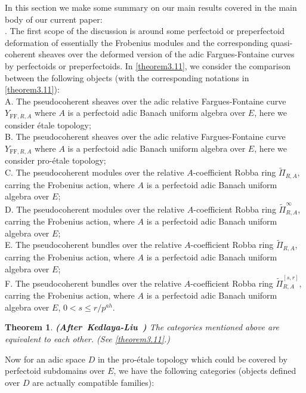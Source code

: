 \documentclass[12pt]{amsart}
\newtheorem{theorem}{Theorem}[section]
\theoremstyle{definition}
\numberwithin{equation}{section}
\begin{document}
\indent In this section we make some summary on our main results covered in the main body of our current paper:\\

. The first scope of the discussion is around some perfectoid or preperfectoid deformation of essentially the Frobenius modules and the corresponding quasi-coherent sheaves over the deformed version of the adic Fargues-Fontaine curves by perfectoids or preperfectoids. In \cref{theorem3.11}, we consider the comparison between the following objects (with the corresponding notations in \cref{theorem3.11}):\\

\noindent A. The pseudocoherent sheaves over the adic relative Fargues-Fontaine curve $Y_{\mathrm{FF},R,A}$ where $A$ is a perfectoid adic Banach uniform algebra over $E$, here we consider \'etale topology;\\
\noindent B. The pseudocoherent sheaves over the adic relative Fargues-Fontaine curve $Y_{\mathrm{FF},R,A}$ where $A$ is a perfectoid adic Banach uniform algebra over $E$, here we consider pro-\'etale topology;\\
\noindent C. The pseudocoherent modules over the relative $A$-coefficient Robba ring $\widetilde{\Pi}_{R,A}$, carring the Frobenius action, where $A$ is a perfectoid adic Banach uniform algebra over $E$;\\
\noindent D. The pseudocoherent modules over the relative $A$-coefficient Robba ring $\widetilde{\Pi}^\infty_{R,A}$, carring the Frobenius action, where $A$ is a perfectoid adic Banach uniform algebra over $E$;\\ 
\noindent E. The pseudocoherent bundles over the relative $A$-coefficient Robba ring $\widetilde{\Pi}_{R,A}$, carring the Frobenius action, where $A$ is a perfectoid adic Banach uniform algebra over $E$;\\
\noindent F. The pseudocoherent bundles over the relative $A$-coefficient Robba ring $\widetilde{\Pi}^{[s,r]}_{R,A}$, carring the Frobenius action, where $A$ is a perfectoid adic Banach uniform algebra over $E$, $0<s\leq r/p^{ah}$.

\begin{theorem}\mbox{\bf{(After Kedlaya-Liu \cite[Theorem 4.6.1]{KL2})}}
The categories mentioned above are equivalent to each other. (See \cref{theorem3.11}.)
	
\end{theorem}


\indent Now for an adic space $D$ in the pro-\'etale topology which could be covered by perfectoid subdomains over $E$, we have the following categories (objects defined over $D$ are actually compatible families):\\
\end{document}
